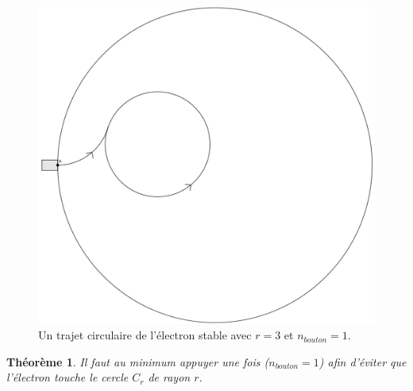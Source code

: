 \documentclass[a4paper]{amsart}
\newtheorem{theorem}{Théorème}[section]
\theoremstyle{definition}
\theoremstyle{remark}
\numberwithin{equation}{section}
\begin{document}
\begin{figure}[H]
  \centering
  \includegraphics[scale=0.15]{images/inside_circle.png}
  \caption{Un trajet circulaire de l'électron stable avec $r=3$ et $n_{bouton}=1$.}
\end{figure}

\begin{theorem}
  Il faut au minimum appuyer une fois ($n_{bouton}=1$) afin d'éviter que l'électron touche le cercle $C_r$ de rayon $r$.
\end{theorem}
\end{document}
